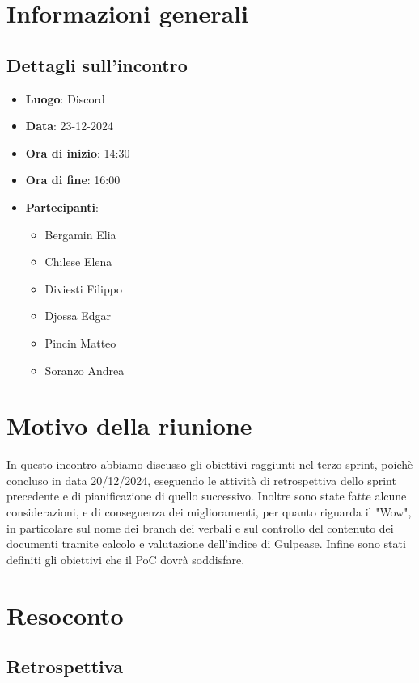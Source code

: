 \section{Informazioni generali}
\subsection{Dettagli sull'incontro}
\begin{itemize}
    \item \textbf{Luogo}: Discord
    \item \textbf{Data}: 23-12-2024
    \item \textbf{Ora di inizio}: 14:30
    \item \textbf{Ora di fine}: 16:00
    \item \textbf{Partecipanti}:
    \begin{itemize}
        \item Bergamin Elia
        \item Chilese Elena
        \item Diviesti Filippo
        \item Djossa Edgar
        \item Pincin Matteo 
        \item Soranzo Andrea  
    \end{itemize}
\end{itemize}

\section{Motivo della riunione}
In questo incontro abbiamo discusso gli obiettivi raggiunti nel terzo sprint, poichè concluso in data 20/12/2024, eseguendo le attività di retrospettiva dello sprint precedente e di pianificazione di quello successivo. Inoltre sono state fatte alcune considerazioni, e di conseguenza dei miglioramenti,
per quanto riguarda il "Wow", in particolare sul nome dei branch dei verbali e sul controllo del contenuto dei documenti tramite calcolo e valutazione dell'indice di Gulpease.
Infine sono stati definiti gli obiettivi che il PoC dovrà soddisfare.

\section{Resoconto}
\subsection{Retrospettiva}

